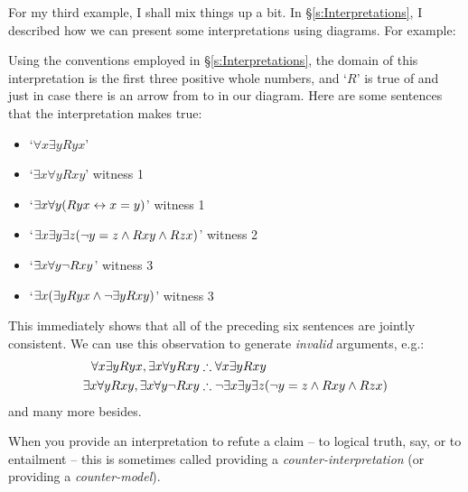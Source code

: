 For my third example, I shall mix things up a bit. In §\ref{s:Interpretations}, I described how we can present some interpretations using diagrams. For example:
\begin{center}
\end{center}
Using the conventions employed in §\ref{s:Interpretations}, the domain of this interpretation is the first three positive whole numbers, and `$R$' is true of  and  just in case there is an arrow from  to  in our diagram. Here are some sentences that the interpretation makes true:
	\begin{itemize}
		\item `$\forall x \exists y Ryx$' 
		\item `$\exists x \forall y Rxy$' \hfill witness 1
		\item `$\exists x \forall y (Ryx \leftrightarrow x = y)$' \hfill witness 1
		\item `$\exists x \exists y \exists z (\neg y = z \wedge Rxy \wedge Rzx)$' \hfill witness 2
		\item `$\exists x \forall y \neg Rxy$' \hfill witness 3
		\item `$\exists x (\exists y Ryx \wedge \neg \exists y Rxy)$' \hfill witness 3
	\end{itemize}
This immediately shows that all of the preceding six sentences are jointly consistent. We can use this observation to generate \emph{invalid} arguments, e.g.:
	\begin{align*}
		\forall x \exists y Ryx, \exists x \forall y Rxy  &\mathrel{\therefore}  \forall x \exists y Rxy\\
		\exists x \forall y Rxy, \exists x \forall y \neg Rxy & \mathrel{\therefore} \neg \exists x \exists y \exists z (\neg y = z \wedge Rxy \wedge Rzx)
	\end{align*}
and many more besides.

When you provide an interpretation to refute a claim – to logical truth, say, or to entailment – this is sometimes called providing a \emph{counter-interpretation} (or providing a \emph{counter-model}).

